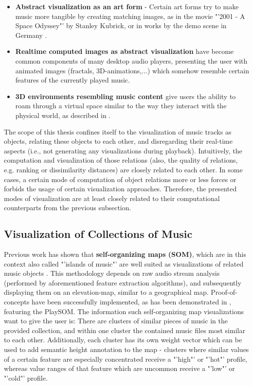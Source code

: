 \begin{itemize}
	\item \textbf{Abstract visualization as an art form} - Certain art forms try to make music more tangible by creating matching images, as in the movie "'2001 - A Space Odyssey"' by Stanley Kubrick, or in works by the demo scene in Germany \cite{Scheib:2002}.
	\item \textbf{Realtime computed images as abstract visualization} have become common components of many desktop audio players, presenting the user with animated images (fractals, 3D-animations,...) which somehow resemble certain features of the currently played music.
	\item \textbf{3D environments resembling music content} give users the ability to roam through a virtual space similar to the way they interact with the physical world, as described in \cite{Dittenbach:2007}.
\end{itemize}

The scope of this thesis confines itself to the visualization of music tracks as objects, relating these objects to each other, and disregarding their real-time aspects (i.e., not generating any visualizations during playback). Intuitively, the computation and visualization of those relations (also, the quality of relations, e.g. ranking or dissimilarity distances) are closely related to each other. In some cases, a certain mode of computation of object relations more or less forces or forbids the usage of certain visualization approaches. Therefore, the presented modes of visualization are at least closely related to their computational counterparts from the previous subsection.

\subsection{Visualization of Collections of Music}

Previous work has shown that \textbf{self-organizing maps (SOM)}, which are in this context also called "'islands of music"' are well suited as visualizations of related music objects \cite{Cooper:2006:VAM}. This methodology depends on raw audio stream analysis (performed by aforementioned feature extraction algorithms), and subsequently displaying them on an elevation-map, similar to a geographical map. Proof-of-concepts have been successfully implemented, as has been demonstrated in \cite{NeuDitRau_05ismir}, featuring the PlaySOM. The information such self-organizing map visualizations want to give the user is: There are clusters of similar pieces of music in the provided collection, and within one cluster the contained music files most similar to each other. Additionally, each cluster has its own weight vector which can be used to add semantic height annotation to the map - clusters where similar values of a certain feature are especially concentrated receive a "'high"' or "'hot"' profile, whereas value ranges of that feature which are uncommon receive a "'low"' or "'cold"' profile.

